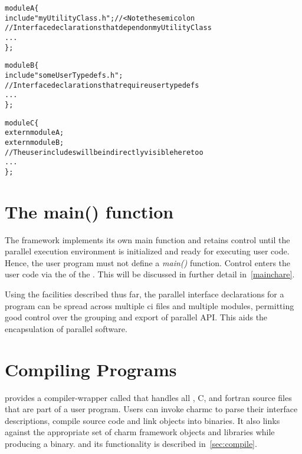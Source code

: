 \begin{alltt}
module A \{
    include "myUtilityClass.h"; //< Note the semicolon
    // Interface declarations that depend on myUtilityClass
    ...
\};

module B \{
    include "someUserTypedefs.h";
    // Interface declarations that require user typedefs
    ...
\};

module C \{
    extern module A;
    extern module B;
    // The user includes will be indirectly visible here too
    ...
\};
\end{alltt}


\section{The main() function}

The \charmpp framework implements its own main\(\) function and retains control
until the parallel execution environment is initialized and ready for executing
user code. Hence, the user program must not define a \emph{main()} function.
Control enters the user code via the  of the .
This will be discussed in further detail in~\ref{mainchare}.

Using the facilities described thus far, the parallel interface declarations
for a \charm program can be spread across multiple ci files and multiple
modules, permitting good control over the grouping and export of parallel API.
This aids the encapsulation of parallel software.

\section{Compiling \charm Programs}

\charm provides a compiler-wrapper called  that handles all \ci, C,
\CC and fortran source files that are part of a user program. Users can invoke
charmc to parse their interface descriptions, compile source code and link
objects into binaries. It also links against the appropriate set of charm
framework objects and libraries while producing a binary.  and its functionality
is described in~\ref{sec:compile}.

